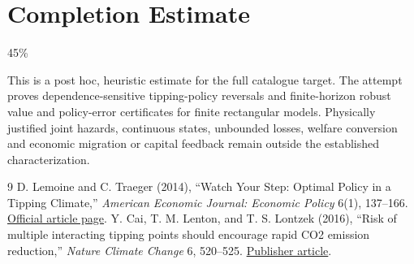 \documentclass[11pt]{article}
\theoremstyle{definition}
\begin{document}
\section{Completion Estimate}
45\%

This is a post hoc, heuristic estimate for the full catalogue target.
The attempt proves dependence-sensitive tipping-policy reversals and finite-horizon robust value and policy-error certificates for finite rectangular models. Physically justified joint hazards, continuous states, unbounded losses, welfare conversion and economic migration or capital feedback remain outside the established characterization.

\begin{thebibliography}{9}
 D. Lemoine and C. Traeger (2014), ``Watch Your Step: Optimal Policy in a Tipping Climate,'' \emph{American Economic Journal: Economic Policy} 6(1), 137--166. \href{https://www.aeaweb.org/articles?id=10.1257/pol.6.1.137}{Official article page}.
 Y. Cai, T. M. Lenton, and T. S. Lontzek (2016), ``Risk of multiple interacting tipping points should encourage rapid CO2 emission reduction,'' \emph{Nature Climate Change} 6, 520--525. \href{https://www.nature.com/articles/nclimate2964}{Publisher article}.
\end{thebibliography}
\end{document}
